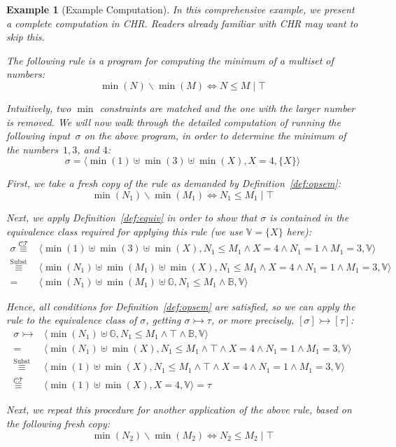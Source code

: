 \documentclass{tlp}
\newtheorem{example}{Example}[section]
\newcommand{\st}[3]{\ensuremath{\langle #1 , #2 , #3 \rangle}}
\newcommand{\CT}{\ensuremath{\mathcal{CT}}}
\newcommand{\bbB}{\ensuremath{\mathbb{B}}}
\newcommand{\bbG}{\ensuremath{\mathbb{G}}}
\newcommand{\bbV}{\ensuremath{\mathbb{V}}}
\newcommand{\der}{\ensuremath{\rightarrowtail}}
\newcommand{\eqct}{\ensuremath{\stackrel{\CT}{\equiv}}}
\newcommand{\eqsubst}{\ensuremath{\stackrel{\text{Subst}}{\equiv}}}
\begin{document}
\begin{example}[Example Computation]
In this comprehensive example, we present a complete computation in CHR. Readers
already familiar with CHR may want to skip this.

The following rule \cite{fruehwirth09} is a program for computing the minimum of
a multiset of numbers: \[ \min(N) \backslash \min(M) \Leftrightarrow N \le M
\mid \top \]

Intuitively, two $\min$ constraints are matched and the one with the larger
number is removed. We will now walk through the detailed computation of running
the following input~$\sigma$ on the above program, in order to determine the
minimum of the numbers~$1,3$, and $4$: \[ \sigma = \st{\min(1) \uplus \min(3)
\uplus \min(X)}{X=4}{\{X\}} \]

First, we take a fresh copy of the rule as demanded by
Definition~\ref{def:opsem}: \[ \min(N_1) \backslash \min(M_1) \Leftrightarrow
N_1 \le M_1 \mid \top \]

Next, we apply Definition~\ref{def:equiv} in order to show that $\sigma$ is
contained in the equivalence class required for applying this rule (we use
$\bbV = \{X\}$ here):
\[
\begin{array}{cl}
\sigma \eqct & \st{\min(1) \uplus \min(3) \uplus \min(X)}{N_1 \le M_1 \land X=4
\land N_1=1 \land M_1=3}{\bbV} \\
\eqsubst & \st{\min(N_1) \uplus \min(M_1) \uplus \min(X)}{N_1 \le M_1 \land
X=4 \land N_1=1 \land M_1=3}{\bbV}\\
= & \st{\min(N_1) \uplus \min(M_1) \uplus \bbG}{N_1 \le M_1 \land \bbB}{\bbV}
\end{array}
\]

Hence, all conditions for Definition~\ref{def:opsem} are satisfied, so we can
apply the rule to the equivalence class of $\sigma$, getting $\sigma \der
\tau$, or more precisely, $[\sigma] \der [\tau]$: 
\[ 
\begin{array}{cl}
\sigma \der & \st{\min(N_1) \uplus \bbG}{N_1 \le M_1 \land \top \land
\bbB}{\bbV}\\
= & \st{\min(N_1) \uplus \min(X)}{N_1 \le M_1 \land \top \land X=4 \land N_1 = 1
\land M_1 = 3}{\bbV} \\
\eqsubst & \st{\min(1) \uplus \min(X)}{N_1 \le M_1 \land \top \land X=4 \land
N_1=1 \land M_1 = 3}{\bbV} \\
\eqct & \st{\min(1) \uplus \min(X)}{X=4}{\bbV} = \tau
\end{array}
\]

Next, we repeat this procedure for another application of the above rule, based
on the following fresh copy: \[ \min(N_2) \backslash \min(M_2) \Leftrightarrow
N_2 \le M_2 \mid \top \]


\end{example}
\end{document}
